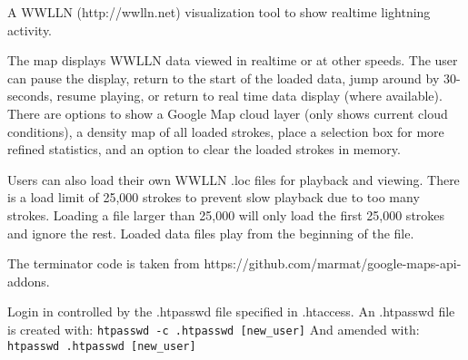 A WWLLN (http://wwlln.net) visualization tool to show realtime lightning activity.

The map displays WWLLN data viewed in realtime or at other speeds.
The user can pause the display, return to the start of the loaded data, jump around by 30-seconds, resume playing, or return to real time data display (where available).
There are options to show a Google Map cloud layer (only shows current cloud conditions), a density map of all loaded strokes, place a selection box for more refined statistics, and an option to clear the loaded strokes in memory.

Users can also load their own WWLLN .loc files for playback and viewing.
There is a load limit of 25,000 strokes to prevent slow playback due to too many strokes.
Loading a file larger than 25,000 will only load the first 25,000 strokes and ignore the rest.
Loaded data files play from the beginning of the file.

The terminator code is taken from https://github.com/marmat/google-maps-api-addons.

Login in controlled by the .htpasswd file specified in .htaccess.  An .htpasswd file is created with: \texttt{htpasswd -c .htpasswd [new\_user]}
And amended with: \texttt{htpasswd .htpasswd [new\_user]}


